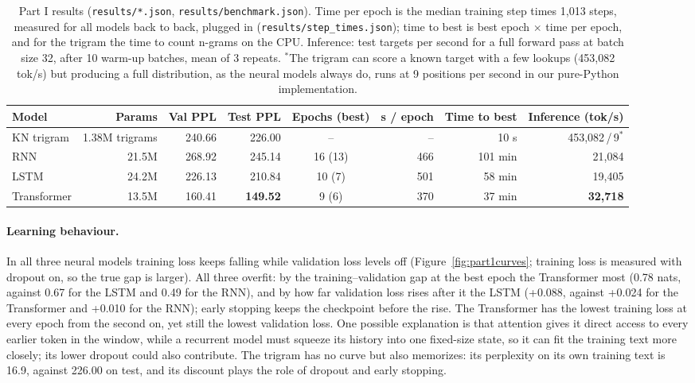 \documentclass[10pt]{article}
\newcommand{\tok}[1]{\texttt{#1}}
\begin{document}
\begin{table}[h]
\centering\footnotesize\setlength{\tabcolsep}{4pt}
\begin{tabular}{lrrrcrrr}
\toprule
Model & Params & Val PPL & Test PPL & Epochs (best) & s / epoch & Time to best & Inference (tok/s) \\
\midrule
KN trigram & 1.38M trigrams & 240.66 & 226.00 & -- & -- & 10 s & 453,082\,/\,9$^{*}$ \\
RNN & 21.5M & 268.92 & 245.14 & 16 (13) & 466 & 101 min & 21,084 \\
LSTM & 24.2M & 226.13 & 210.84 & 10 (7) & 501 & 58 min & 19,405 \\
Transformer & 13.5M & 160.41 & \textbf{149.52} & 9 (6) & 370 & 37 min & \textbf{32,718} \\
\bottomrule
\end{tabular}
\caption{Part I results (\tok{results/*.json}, \tok{results/benchmark.json}). Time per epoch is the median training step times 1,013 steps, measured for all models back to back, plugged in (\tok{results/step\_times.json}); time to best is best epoch $\times$ time per epoch, and for the trigram the time to count n-grams on the CPU. Inference: test targets per second for a full forward pass at batch size 32, after 10 warm-up batches, mean of 3 repeats. $^{*}$The trigram can score a known target with a few lookups (453,082 tok/s) but producing a full distribution, as the neural models always do, runs at 9 positions per second in our pure-Python implementation.}
\label{tab:part1}
\end{table}

\paragraph{Learning behaviour.} In all three neural models training loss keeps falling while validation loss levels off (Figure~\ref{fig:part1curves}; training loss is measured with dropout on, so the true gap is larger). All three overfit: by the training--validation gap at the best epoch the Transformer most (0.78 nats, against 0.67 for the LSTM and 0.49 for the RNN), and by how far validation loss rises after it the LSTM (+0.088, against +0.024 for the Transformer and +0.010 for the RNN); early stopping keeps the checkpoint before the rise. The Transformer has the lowest training loss at every epoch from the second on, yet still the lowest validation loss. One possible explanation is that attention gives it direct access to every earlier token in the window, while a recurrent model must squeeze its history into one fixed-size state, so it can fit the training text more closely; its lower dropout could also contribute. The trigram has no curve but also memorizes: its perplexity on its own training text is 16.9, against 226.00 on test, and its discount plays the role of dropout and early stopping.
\end{document}
